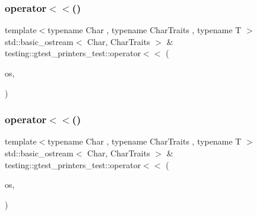 \subsubsection{\texorpdfstring{operator$<$$<$()}{operator<<()}\hspace{0.1cm}{\footnotesize\ttfamily [2/3]}}
{\footnotesize\ttfamily template$<$typename Char , typename Char\+Traits , typename T $>$ \\
std\+::basic\+\_\+ostream$<$ Char, Char\+Traits $>$ \& testing\+::gtest\+\_\+printers\+\_\+test\+::operator$<$$<$ (\begin{DoxyParamCaption}\item[{std\+::basic\+\_\+ostream$<$ Char, Char\+Traits $>$ \&}]{os,  }\item[{const \mbox{\hyperlink{classtesting_1_1gtest__printers__test_1_1_allows_generic_streaming_template}{Allows\+Generic\+Streaming\+Template}}$<$ T $>$ \&}]{ }\end{DoxyParamCaption})}

\mbox{\label{namespacetesting_1_1gtest__printers__test_aa9c63d8e146c98f3277ffba8b29b3c5e}} 
\subsubsection{\texorpdfstring{operator$<$$<$()}{operator<<()}\hspace{0.1cm}{\footnotesize\ttfamily [3/3]}}
{\footnotesize\ttfamily template$<$typename Char , typename Char\+Traits , typename T $>$ \\
std\+::basic\+\_\+ostream$<$ Char, Char\+Traits $>$ \& testing\+::gtest\+\_\+printers\+\_\+test\+::operator$<$$<$ (\begin{DoxyParamCaption}\item[{std\+::basic\+\_\+ostream$<$ Char, Char\+Traits $>$ \&}]{os,  }\item[{const \mbox{\hyperlink{classtesting_1_1gtest__printers__test_1_1_allows_generic_streaming_and_implicit_conversion_template}{Allows\+Generic\+Streaming\+And\+Implicit\+Conversion\+Template}}$<$ T $>$ \&}]{ }\end{DoxyParamCaption})}

\mbox{\label{namespacetesting_1_1gtest__printers__test_ab1fefdb330a473343afa3cc6d46a65f6}} 

